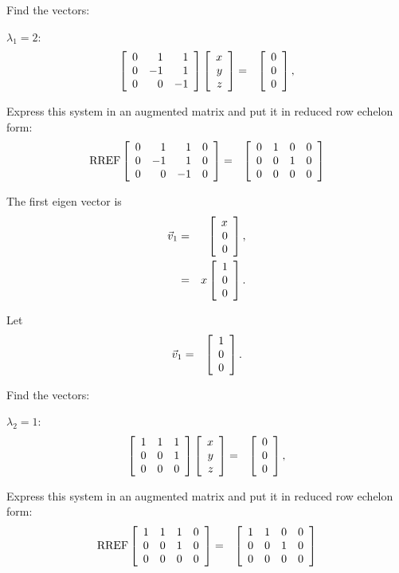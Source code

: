 \begin{frame}
  Find the vectors:

  $\lambda_1 = 2$:
  \begin{eqnarray*}
    \left[ \begin{array}{rrr} 0 & 1 & 1 \\ 0 & -1 & 1 \\ 0 & 0 & -1 \end{array} \right]\left[ \begin{array}{r} x \\ y \\ z \end{array} \right] & = & \left[ \begin{array}{r} 0 \\ 0 \\ 0 \end{array} \right], \\
  \end{eqnarray*}

  Express this system in an augmented matrix and put it in reduced row
  echelon form:
  \begin{eqnarray*}
    \mathrm{RREF}\left[ \begin{array}{rrrr}
    0 & 1 & 1 & 0 \\  
    0 & -1 & 1 & 0 \\ 
    0 & 0 & -1 & 0 \\ 
    \end{array} \right]
    & = & 
    \left[ \begin{array}{rrrr}
    0 & 1 & 0 & 0 \\  
    0 & 0 & 1 & 0 \\ 
    0 & 0 & 0 & 0 \\ 
    \end{array} \right]
  \end{eqnarray*}


\end{frame}

\begin{frame}
  The first eigen vector is 
  \begin{eqnarray*}
    \vec{v}_1 & = & \left[ \begin{array}{r} x \\ 0 \\ 0 \end{array} \right], \\
    & = & x \left[ \begin{array}{r} 1 \\ 0 \\ 0 \end{array} \right].
  \end{eqnarray*}

  Let
  \begin{eqnarray*}
    \vec{v}_1 & = & \left[ \begin{array}{r} 1 \\ 0 \\ 0 \end{array} \right].
  \end{eqnarray*}

\end{frame}

\begin{frame}
  Find the vectors:

  $\lambda_2 = 1$:
  \begin{eqnarray*}
    \left[ \begin{array}{rrr} 1 & 1 & 1 \\ 0 & 0 & 1 \\ 0 & 0 & 0 \end{array} \right]
    \left[ \begin{array}{r} x \\ y \\ z \end{array} \right] & = & \left[ \begin{array}{r} 0 \\ 0 \\ 0 \end{array} \right], \\
  \end{eqnarray*}

  Express this system in an augmented matrix and put it in reduced row
  echelon form:
  \begin{eqnarray*}
    \mathrm{RREF}\left[ \begin{array}{rrrr}
    1 & 1 & 1 & 0 \\  
    0 & 0 & 1 & 0 \\ 
    0 & 0 & 0 & 0 \\ 
    \end{array} \right]
    & = & 
    \left[ \begin{array}{rrrr}
    1 & 1 & 0 & 0 \\  
    0 & 0 & 1 & 0 \\ 
    0 & 0 & 0 & 0 \\ 
    \end{array} \right]
  \end{eqnarray*}

\end{frame}

